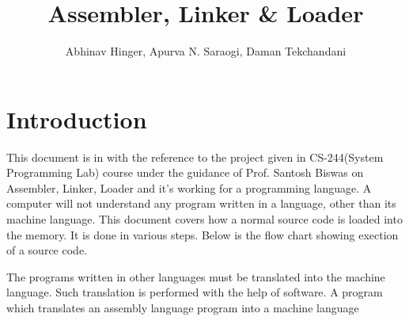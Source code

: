 \documentclass[a4paper,12pt]{extarticle}
\begin{document}
	\title{Assembler, Linker \& Loader}
	\author{Abhinav Hinger, Apurva N. Saraogi, Daman Tekchandani}
	\maketitle
	\pagebreak
	\tableofcontents
	\pagebreak
	\section{Introduction}
This document is in with the reference to the project given in CS-244(System Programming Lab) course under the guidance of Prof. Santosh Biswas on Assembler, Linker, Loader and it's working for a programming language.\newline\newline
A computer will not understand any program written in a language, other than its
machine language. This document covers how a normal source code is loaded into the memory. It is done in various steps. Below is the flow chart showing exection of a source code.\newline
	\newline
	\newline
	The programs written in other languages must be translated into
	the machine language. Such translation is performed with the help of software. A program which translates an assembly language program into a machine language
\end{document}
